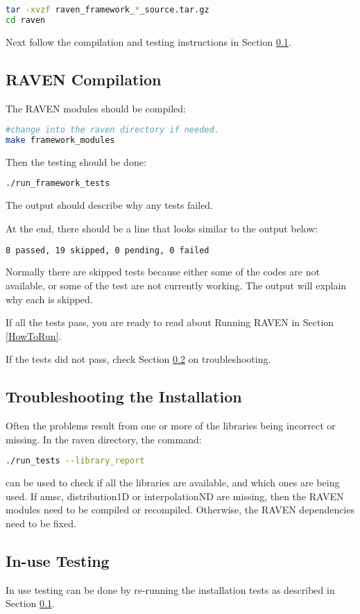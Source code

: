 \begin{lstlisting}[language=bash]
tar -xvzf raven_framework_*_source.tar.gz
cd raven
\end{lstlisting}

Next follow the compilation and testing instructions in Section
\ref{raven_compilation}.

\subsection{RAVEN Compilation}
\label{raven_compilation}

The RAVEN modules should be compiled:

\begin{lstlisting}[language=bash]
#change into the raven directory if needed.
make framework_modules
\end{lstlisting}

Then the testing should be done:

\begin{lstlisting}[language=bash]
./run_framework_tests
\end{lstlisting}

The output should describe why any tests failed.

At the end, there should be a line that looks similar to the output below:
\begin{lstlisting}[language=bash]
8 passed, 19 skipped, 0 pending, 0 failed
\end{lstlisting}

Normally there are skipped tests because either some of the codes are
not available, or some of the test are not currently working.  The
output will explain why each is skipped.

If all the tests pass, you are ready to read about Running RAVEN in
Section \ref{HowToRun}.

If the tests did not pass, check Section
\ref{troubleshooting_installation} on troubleshooting.

\subsection{Troubleshooting the Installation}
\label{troubleshooting_installation}

Often the problems result from one or more of the libraries being
incorrect or missing.  In the raven directory, the command:

\begin{lstlisting}[language=bash]
./run_tests --library_report
\end{lstlisting}
can be used to check if all the libraries are available, and which
ones are being used.  If amsc, distribution1D or interpolationND are
missing, then the RAVEN modules need to be compiled or recompiled.
Otherwise, the RAVEN dependencies need to be fixed.

\subsection{In-use Testing}

In use testing can be done by re-running the installation tests as
described in Section \ref{raven_compilation}.
